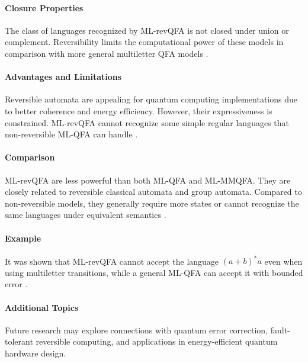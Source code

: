 \paragraph{Closure Properties}
The class of languages recognized by ML-revQFA is not closed under union or complement. Reversibility limits the computational power of these models in comparison with more general multiletter QFA models \cite{belovs2007multi}.

\paragraph{Advantages and Limitations}
Reversible automata are appealing for quantum computing implementations due to better coherence and energy efficiency. However, their expressiveness is constrained. ML-revQFA cannot recognize some simple regular languages that non-reversible ML-QFA can handle \cite{belovs2007multi}.

\paragraph{Comparison}
ML-revQFA are less powerful than both ML-QFA and ML-MMQFA. They are closely related to reversible classical automata and group automata. Compared to non-reversible models, they generally require more states or cannot recognize the same languages under equivalent semantics \cite{belovs2007multi}.

\paragraph{Example}
It was shown that ML-revQFA cannot accept the language $(a+b)^*a$ even when using multiletter transitions, while a general ML-QFA can accept it with bounded error \cite{belovs2007multi}.

\paragraph{Additional Topics}
Future research may explore connections with quantum error correction, fault-tolerant reversible computing, and applications in energy-efficient quantum hardware design.


